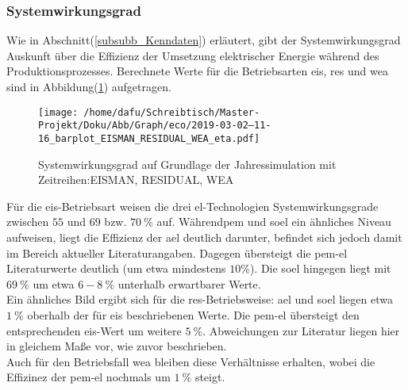 \documentclass[onecolumn,10pt,titlepage]{article}
\begin{document}
\subsubsection{Systemwirkungsgrad}
Wie in Abschnitt(\ref{subsubb_Kenndaten}) erläutert, gibt der Systemwirkungsgrad Auskunft über die Effizienz der Umsetzung elektrischer Energie während des Produktionsprozesses. Berechnete Werte für die Betriebsarten \gls{eis}, \gls{res} und \gls{wea} sind in Abbildung(\ref{fig:analy_nC_eta}) aufgetragen.
\begin{figure}[H]

	\centering
	\texttt{[image: /home/dafu/Schreibtisch/Master-Projekt/Doku/Abb/Graph/eco/2019-03-02--11-16\_barplot\_EISMAN\_RESIDUAL\_WEA\_eta.pdf]}
	\caption[Systemwirkungsgrad EIS, RES, WEA]{Systemwirkungsgrad auf Grundlage der Jahressimulation mit Zeitreihen:EISMAN, RESIDUAL, WEA }
	\label{fig:analy_nC_eta}
\end{figure}
Für die \gls{eis}-Betriebsart weisen die drei \gls{el}-Technologien Systemwirkungsgrade zwischen $55 $ und $69$ bzw. $70~\%$ auf. Während\gls{pem} und \gls{soel} ein ähnliches Niveau aufweisen, liegt die Effizienz der \gls{ael} deutlich darunter, befindet sich jedoch damit im Bereich aktueller Literaturangaben.\cite{Buttler.2018}
Dagegen übersteigt die \gls{pem}-\gls{el} Literaturwerte deutlich (um etwa mindestens $10\%$). Die \gls{soel} hingegen liegt mit $69~\%$ um etwa $6-8~\%$ unterhalb erwartbarer Werte.\\
Ein ähnliches Bild ergibt sich für die \gls{res}-Betriebsweise: \gls{ael} und \gls{soel} liegen etwa $1~\%$ oberhalb der für \gls{eis} beschriebenen Werte. Die \gls{pem}-\gls{el} übersteigt den entsprechenden \gls{eis}-Wert um weitere $5~\%$. Abweichungen zur Literatur liegen hier in gleichem Maße vor, wie zuvor beschrieben.\\
Auch für den Betriebsfall \gls{wea} bleiben diese Verhältnisse erhalten, wobei die Effizinez der \gls{pem}-\gls{el} nochmals um $1~ \%$ steigt.\\
\end{document}
